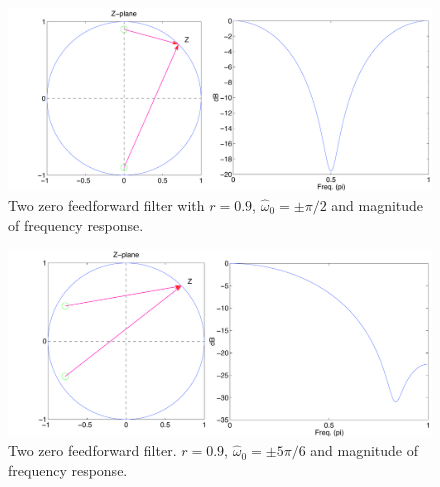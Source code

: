 \begin{figure}[t]
\centerline{\includegraphics[width=6in]{ch-fir/ffexp_2tdelay_czh90_r0-9}}
\caption[Two zero filter $r=0.9$, $\hat{\omega}_0=\pm\pi/2$.]{Two zero feedforward filter with $r=0.9$, $\hat{\omega}_0=\pm\pi/2$ and magnitude of frequency response.
\label{fig:ff-exp2zs90}}
\end{figure}

\begin{figure}[t]
\centerline{\includegraphics[width=6in]{ch-fir/ffexp_2tdelay_czh150_r0-9}}
\caption[Two zero filter $r=0.9$, $\hat{\omega}_0=\pm5\pi/6$.]{Two zero feedforward filter. $r=0.9$, $\hat{\omega}_0=\pm5\pi/6$ and magnitude of frequency response.
\label{fig:ff-exp2zs150}}
\end{figure}

%

